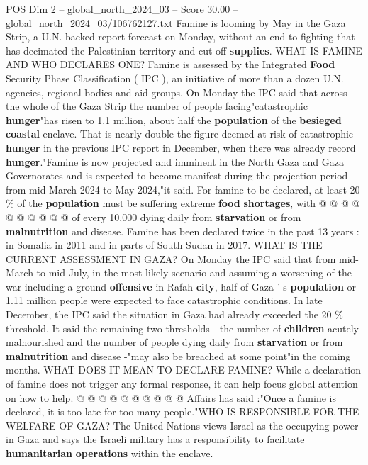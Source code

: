 \begin{textsample}{POS Dim 2 – global\_north\_2024\_03 – Score 30.00 – global\_north\_2024\_03/106762127.txt}  \label{ex:f2_pos_107}
Famine is looming by May in the Gaza Strip, a U.N.-backed report forecast on Monday, without an end to fighting that has decimated the Palestinian territory and cut off \textbf{supplies}.
WHAT IS FAMINE AND WHO DECLARES ONE?
Famine is assessed by the Integrated \textbf{Food} Security Phase Classification ( IPC ), an initiative of more than a dozen U.N. agencies, regional bodies and aid groups.
On Monday the IPC said that across the whole of the Gaza Strip the number of people facing"catastrophic \textbf{hunger}"has risen to 1.1 million, about half the \textbf{population} of the \textbf{besieged} \textbf{coastal} enclave.
That is nearly double the figure deemed at risk of catastrophic \textbf{hunger} in the previous IPC report in December, when there was already record \textbf{hunger}."Famine is now projected and imminent in the North Gaza and Gaza Governorates and is expected to become manifest during the projection period from mid-March 2024 to May 2024,"it said.
For famine to be declared, at least 20 \% of the \textbf{population} must be suffering extreme \textbf{food} \textbf{shortages}, with @ @ @ @ @ @ @ @ @ @ of every 10,000 dying daily from \textbf{starvation} or from \textbf{malnutrition} and disease.
Famine has been declared twice in the past 13 years : in Somalia in 2011 and in parts of South Sudan in 2017.
WHAT IS THE CURRENT ASSESSMENT IN GAZA?
On Monday the IPC said that from mid-March to mid-July, in the most likely scenario and assuming a worsening of the war including a ground \textbf{offensive} in Rafah \textbf{city}, half of Gaza ' s \textbf{population} or 1.11 million people were expected to face catastrophic conditions.
In late December, the IPC said the situation in Gaza had already exceeded the 20 \% threshold.
It said the remaining two thresholds - the number of \textbf{children} acutely malnourished and the number of people dying daily from \textbf{starvation} or from \textbf{malnutrition} and disease -"may also be breached at some point"in the coming months.
WHAT DOES IT MEAN TO DECLARE FAMINE?
While a declaration of famine does not trigger any formal response, it can help focus global attention on how to help. @ @ @ @ @ @ @ @ @ @ Affairs has said :"Once a famine is declared, it is too late for too many people."WHO IS RESPONSIBLE FOR THE WELFARE OF GAZA?
The United Nations views Israel as the occupying power in Gaza and says the Israeli military has a responsibility to facilitate \textbf{humanitarian} \textbf{operations} within the enclave.

\end{textsample}
